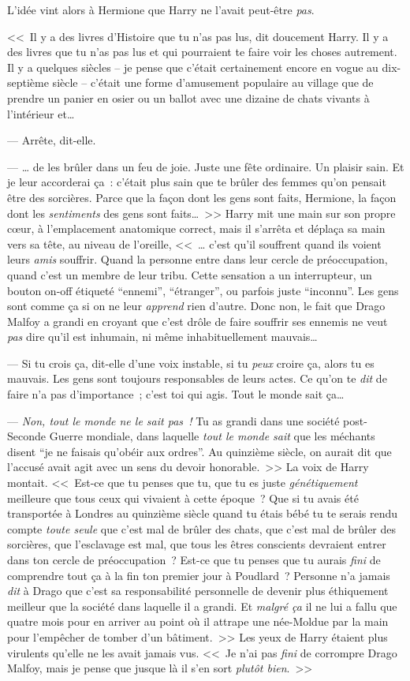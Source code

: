 L'idée vint alors à Hermione que Harry ne l'avait peut-être \emph{pas}.

<<~Il y a des livres d'Histoire que tu n'as pas lus, dit doucement Harry. Il y a des livres que tu n'as pas lus et qui pourraient te faire voir les choses autrement. Il y a quelques siècles -- je pense que c'était certainement encore en vogue au dix-septième siècle -- c'était une forme d'amusement populaire au village que de prendre un panier en osier ou un ballot avec une dizaine de chats vivants à l'intérieur et…

--- Arrête, dit-elle.

--- … de les brûler dans un feu de joie. Juste une fête ordinaire. Un plaisir sain. Et je leur accorderai ça~: c'était plus sain que te brûler des femmes qu'on pensait être des sorcières. Parce que la façon dont les gens sont faits, Hermione, la façon dont les \emph{sentiments} des gens sont faits…~>> Harry mit une main sur son propre cœur, à l'emplacement anatomique correct, mais il s'arrêta et déplaça sa main vers sa tête, au niveau de l'oreille, <<~… c'est qu'il souffrent quand ils voient leurs \emph{amis} souffrir. Quand la personne entre dans leur cercle de préoccupation, quand c'est un membre de leur tribu. Cette sensation a un interrupteur, un bouton on-off étiqueté “ennemi”, “étranger”, ou parfois juste “inconnu”. Les gens sont comme ça si on ne leur \emph{apprend} rien d'autre. Donc non, le fait que Drago Malfoy a grandi en croyant que c'est drôle de faire souffrir ses ennemis ne veut \emph{pas} dire qu'il est inhumain, ni même inhabituellement mauvais…

--- Si tu crois ça, dit-elle d'une voix instable, si tu \emph{peux} croire ça, alors tu es mauvais. Les gens sont toujours responsables de leurs actes. Ce qu'on te \emph{dit} de faire n'a pas d'importance~; c'est toi qui agis. Tout le monde sait ça…

--- \emph{Non, tout le monde ne le sait pas~!} Tu as grandi dans une société post-Seconde Guerre mondiale, dans laquelle \emph{tout le monde sait} que les méchants disent “je ne faisais qu'obéir aux ordres”. Au quinzième siècle, on aurait dit que l'accusé avait agit avec un sens du devoir honorable.~>> La voix de Harry montait. <<~Est-ce que tu penses que tu, que tu es juste \emph{génétiquement} meilleure que tous ceux qui vivaient à cette époque~? Que si tu avais été transportée à Londres au quinzième siècle quand tu étais bébé tu te serais rendu compte \emph{toute seule} que c'est mal de brûler des chats, que c'est mal de brûler des sorcières, que l'esclavage est mal, que tous les êtres conscients devraient entrer dans ton cercle de préoccupation~? Est-ce que tu penses que tu aurais \emph{fini} de comprendre tout ça à la fin ton premier jour à Poudlard~? Personne n'a jamais \emph{dit} à Drago que c'est sa responsabilité personnelle de devenir plus éthiquement meilleur que la société dans laquelle il a grandi. Et \emph{malgré ça} il ne lui a fallu que quatre mois pour en arriver au point où il attrape une née-Moldue par la main pour l'empêcher de tomber d'un bâtiment.~>> Les yeux de Harry étaient plus virulents qu'elle ne les avait jamais vus. <<~Je n'ai pas \emph{fini} de corrompre Drago Malfoy, mais je pense que jusque là il s'en sort \emph{plutôt bien}.~>>

